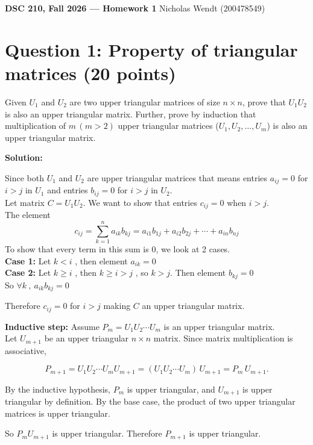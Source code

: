 \documentclass[11pt]{article}
\begin{document}
\textbf{DSC 210, Fall 2026 --- Homework 1} \hfill Nicholas Wendt (200478549)

\section*{Question 1: Property of triangular matrices (20 points)}

Given $U_1$ and $U_2$ are two upper triangular matrices of size $n\times n$, prove that $U_1U_2$ is also an upper triangular matrix. Further, prove by induction that multiplication of $m\,(m>2)$ upper triangular matrices ($U_1, U_2, \dots, U_m$) is also an upper triangular matrix.

\textbf{Solution:}
\bigskip

Since both $U_1$ and $U_2$ are upper triangular matrices that means entries $a_{ij}=0$ for $i>j$
in $U_1$ and entries $b_{ij}=0$ for $i>j$ in $U_2$.\\
Let matrix $C=U_1U_2$. We want to show that entries $c_{ij} = 0$ when $i>j$.\\
The element
$$
c_{ij} = \sum_{k=1}^na_{ik}b_{kj}=a_{i1}b_{1j}+a_{i2}b_{2j}+\cdots+a_{in}b_{nj}
$$
To show that every term in this sum is 0, we look at 2 cases.\\
\textbf{Case 1:} Let $k<i$ , then element $a_{ik}=0$\\
\textbf{Case 2:} Let $k \geq i$ , then $k \geq i > j$ , so $k > j$. Then element $b_{kj}=0$\\
So $\forall k\ , \ a_{ik}b_{kj}=0 $

\bigskip

\noindent Therefore $c_{ij} = 0$ for $i>j$ making $C$ an upper triangular matrix.

\bigskip

\noindent\textbf{Inductive step:} Assume $P_m=U_1U_2 \cdots U_m$ is an upper triangular matrix. \\
Let $U_{m+1}$ be an upper triangular $n\times n$ matrix. Since
matrix multiplication is associative,

$$
P_{m+1} = U_1U_2\cdots U_mU_{m+1} = (U_1U_2\cdots U_m)\,U_{m+1} = P_m\,U_{m+1}.
$$

\noindent By the inductive hypothesis, $P_m$ is upper triangular, and $U_{m+1}$ is upper triangular by
definition. By the base case, the product of two upper triangular matrices is upper triangular.

\medskip

\noindent So $P_mU_{m+1}$ is upper triangular. Therefore $P_{m+1}$ is upper triangular.
\end{document}
